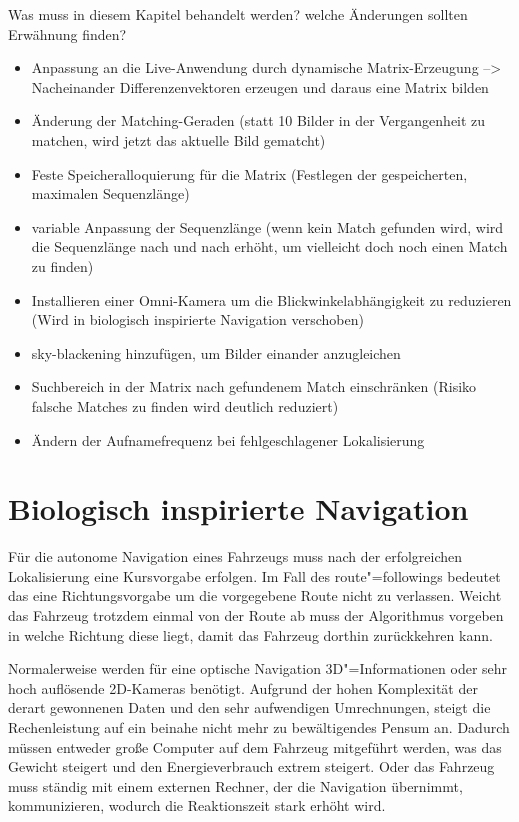 \documentclass[12pt,a4paper,titlepage]{scrartcl}
\newcommand{\cmark}{\Large{\color{OliveGreen}\ding{51}}\normalsize}
\newcommand{\xmark}{\Large{\color{red}\ding{55}}\normalsize}
\begin{document}
Was muss in diesem Kapitel behandelt werden? welche Änderungen sollten Erwähnung finden?
\begin{itemize}
\item Anpassung an die Live-Anwendung durch dynamische Matrix-Erzeugung --> Nacheinander Differenzenvektoren erzeugen und daraus eine Matrix bilden  \cmark
\item Änderung der Matching-Geraden (statt 10 Bilder in der Vergangenheit zu matchen, wird jetzt das aktuelle Bild gematcht)   \cmark
\item Feste Speicheralloquierung für die Matrix (Festlegen der gespeicherten, maximalen Sequenzlänge)   \cmark
\item variable Anpassung der Sequenzlänge (wenn kein Match gefunden wird, wird die Sequenzlänge nach und nach erhöht, um vielleicht doch noch einen Match zu finden)   \cmark
\item Installieren einer Omni-Kamera um die Blickwinkelabhängigkeit zu reduzieren (Wird in biologisch inspirierte Navigation verschoben) \xmark
\item sky-blackening hinzufügen, um Bilder einander anzugleichen   \cmark
\item Suchbereich in der Matrix nach gefundenem Match einschränken (Risiko falsche Matches zu finden wird deutlich reduziert)   \cmark
\item Ändern der Aufnamefrequenz bei fehlgeschlagener Lokalisierung \xmark
\end{itemize}
\pagebreak
\section{Biologisch inspirierte Navigation}
Für die autonome Navigation eines Fahrzeugs muss nach der erfolgreichen Lokalisierung eine Kursvorgabe erfolgen. Im Fall des route"=followings bedeutet das eine Richtungsvorgabe um die vorgegebene Route nicht zu verlassen. Weicht das Fahrzeug trotzdem einmal von der Route ab muss der Algorithmus vorgeben in welche Richtung diese liegt, damit das Fahrzeug dorthin zurückkehren kann. 

Normalerweise werden für eine optische Navigation 3D"=Informationen oder sehr hoch auflösende 2D-Kameras benötigt. Aufgrund der hohen Komplexität der derart gewonnenen Daten und den sehr aufwendigen Umrechnungen, steigt die Rechenleistung auf ein beinahe nicht mehr zu bewältigendes Pensum an. Dadurch müssen entweder große Computer auf dem Fahrzeug mitgeführt werden, was das Gewicht steigert und den Energieverbrauch extrem steigert. Oder das Fahrzeug muss ständig mit einem externen Rechner, der die Navigation übernimmt, kommunizieren, wodurch die Reaktionszeit stark erhöht wird. 
\end{document}
